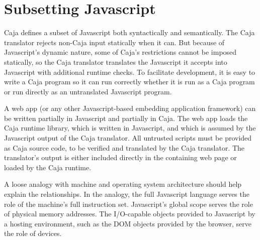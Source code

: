 \documentclass[letterpaper,twocolumn,10pt]{article}
\begin{document}
\section{Subsetting Javascript}

Caja defines a subset of Javascript both syntactically and semantically. The 
Caja translator rejects non-Caja input statically when it can. But because 
of Javascript's dynamic nature, some of Caja's restrictions cannot be 
imposed statically, so the Caja translator translates the Javascript it 
accepts into Javascript with additional runtime checks. To facilitate 
development, it is easy to write a Caja program so it can run correctly 
whether it is run as a Caja program or run directly as an untranslated 
Javascript program.

A web app (or any other Javascript-based embedding application framework) can 
be written partially in Javascript and partially in Caja. The web app loads 
the Caja runtime library, which is written in Javascript, and which is 
assumed by the Javascript output of the Caja translator. All untrusted 
scripts must be provided as Caja source code, to be verified and translated 
by the Caja translator. The translator's output is either included directly 
in the containing web page or loaded by the Caja runtime.

A loose analogy with machine and operating system architecture should help 
explain the relationships. In the analogy, the full Javascript language 
serves the role of the machine's full instruction set. Javascript's global 
scope serves the role of physical memory addresses. The I/O-capable objects 
provided to Javascript by a hosting environment, such as the DOM objects 
provided by the browser, serve the role of devices.
\end{document}
